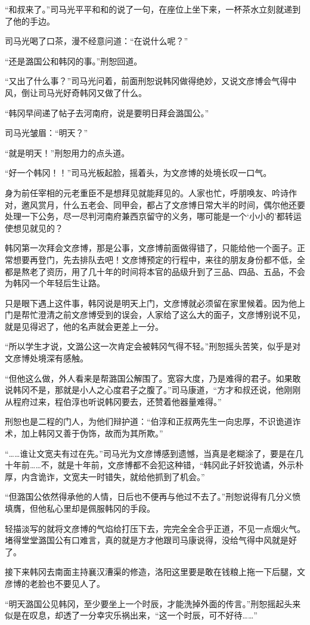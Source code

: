 “和叔来了。”司马光平平和和的说了一句，在座位上坐下来，一杯茶水立刻就递到了他的手边。

司马光喝了口茶，漫不经意问道：“在说什么呢？”

“还是潞国公和韩冈的事。”刑恕回道。

“又出了什么事？”司马光问着，前面刑恕说韩冈做得绝妙，又说文彦博会气得中风，倒让司马光好奇韩冈又做了什么。

“韩冈早间递了帖子去河南府，说是要明日拜会潞国公。”

司马光皱眉：“明天？”

“就是明天！”刑恕用力的点头道。

“好一个韩冈！！”司马光板起脸，摇着头，为文彦博的处境长叹一口气。

身为前任宰相的元老重臣不是想拜见就能拜见的。人家也忙，呼朋唤友、吟诗作对，邀风赏月，什么五老会、同甲会，都占了文彦博日常大半的时间，偶尔他还要处理一下公务，尽一尽判河南府兼西京留守的义务，哪可能是一个‘小小的’都转运使想见就见的？

韩冈第一次拜会文彦博，那是公事，文彦博前面做得错了，只能给他一个面子。正常想要再登门，先去排队去吧！文彦博预定的行程中，来往的朋友身份都不低，全都是熬老了资历，用了几十年的时间将本官的品级升到了三品、四品、五品，不会为韩冈一个年轻后生让路。

只是眼下遇上这件事，韩冈说是明天上门，文彦博就必须留在家里候着。因为他上门是帮忙澄清之前文彦博受到的误会，人家给了这么大的面子，文彦博别说不见，就是见得迟了，他的名声就会更差上一分。

“所以学生才说，文潞公这一次肯定会被韩冈气得不轻。”刑恕摇头苦笑，似乎是对文彦博处境深有感触。

“但他这么做，外人看来是帮潞国公解围了。宽容大度，乃是难得的君子。如果敢说韩冈不是，那就是小人之心度君子之腹了。”司马康道，“方才和叔还说，他刚刚从程府过来，程伯淳也听说韩冈要去，还赞着他器量难得。”

刑恕也是二程的门人，为他们辩护道：“伯淳和正叔两先生一向忠厚，不识诡道诈术，加上韩冈又善于伪饰，故而为其所欺。”

“……谁让文宽夫有过在先。”司马光为文彦博感到遗憾，当真是老糊涂了，要是在几十年前……不，就是十年前，文彦博都不会犯这种错，“韩冈此子奸狡诡谲，外示朴厚，内含诡诈，文宽夫一时错失，就给他抓到了机会。”

“但潞国公依然得承他的人情，日后也不便再与他过不去了。”刑恕说得有几分义愤填膺，但他私心里却是佩服韩冈的手段。

轻描淡写的就将文彦博的气焰给打压下去，完完全全合乎正道，不见一点烟火气。堵得堂堂潞国公有口难言，真的就是方才他跟司马康说得，没给气得中风就是好了。

接下来韩冈去南面主持襄汉漕渠的修造，洛阳这里要是敢在钱粮上拖一下后腿，文彦博的老脸也不要见人了。

“明天潞国公见韩冈，至少要坐上一个时辰，才能洗掉外面的传言。”刑恕摇起头来似是在叹息，却透了一分幸灾乐祸出来，“这一个时辰，可不好待……”

